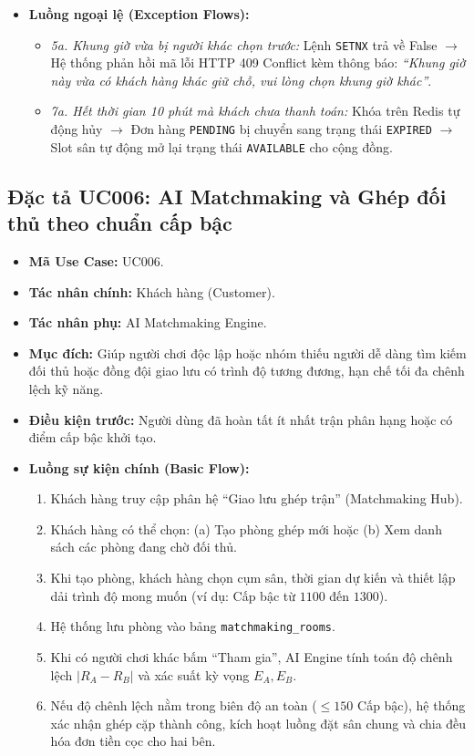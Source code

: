 \begin{itemize}[leftmargin=1.5cm]
    \item \textbf{Luồng ngoại lệ (Exception Flows):}
    \begin{itemize}
        \item \textit{5a. Khung giờ vừa bị người khác chọn trước:} Lệnh \texttt{SETNX} trả về False $\rightarrow$ Hệ thống phản hồi mã lỗi HTTP 409 Conflict kèm thông báo: \textit{``Khung giờ này vừa có khách hàng khác giữ chỗ, vui lòng chọn khung giờ khác''}.
        \item \textit{7a. Hết thời gian 10 phút mà khách chưa thanh toán:} Khóa trên Redis tự động hủy $\rightarrow$ Đơn hàng \texttt{PENDING} bị chuyển sang trạng thái \texttt{EXPIRED} $\rightarrow$ Slot sân tự động mở lại trạng thái \texttt{AVAILABLE} cho cộng đồng.
    \end{itemize}
\end{itemize}

\subsection{Đặc tả UC006: AI Matchmaking và Ghép đối thủ theo chuẩn cấp bậc}
\begin{itemize}[leftmargin=1.5cm]
    \item \textbf{Mã Use Case:} UC006.
    \item \textbf{Tác nhân chính:} Khách hàng (Customer).
    \item \textbf{Tác nhân phụ:} AI Matchmaking Engine.
    \item \textbf{Mục đích:} Giúp người chơi độc lập hoặc nhóm thiếu người dễ dàng tìm kiếm đối thủ hoặc đồng đội giao lưu có trình độ tương đương, hạn chế tối đa chênh lệch kỹ năng.
    \item \textbf{Điều kiện trước:} Người dùng đã hoàn tất ít nhất trận phân hạng hoặc có điểm cấp bậc khởi tạo.
    \item \textbf{Luồng sự kiện chính (Basic Flow):}
    \begin{enumerate}
        \item Khách hàng truy cập phân hệ ``Giao lưu ghép trận'' (Matchmaking Hub).
        \item Khách hàng có thể chọn: (a) Tạo phòng ghép mới hoặc (b) Xem danh sách các phòng đang chờ đối thủ.
        \item Khi tạo phòng, khách hàng chọn cụm sân, thời gian dự kiến và thiết lập dải trình độ mong muốn (ví dụ: Cấp bậc từ $1100$ đến $1300$).
        \item Hệ thống lưu phòng vào bảng \texttt{matchmaking\_rooms}.
        \item Khi có người chơi khác bấm ``Tham gia'', AI Engine tính toán độ chênh lệch $|R_A - R_B|$ và xác suất kỳ vọng $E_A, E_B$.
        \item Nếu độ chênh lệch nằm trong biên độ an toàn ($\le 150$ Cấp bậc), hệ thống xác nhận ghép cặp thành công, kích hoạt luồng đặt sân chung và chia đều hóa đơn tiền cọc cho hai bên.
    \end{enumerate}
\end{itemize}

